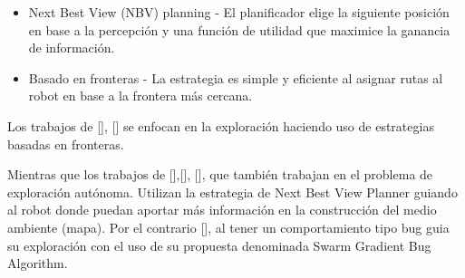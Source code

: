 \begin{itemize}\setlength{\itemsep}{-1mm}
\item Next Best View (NBV) planning - El planificador elige la siguiente posición en base a la percepción y una función de utilidad que maximice la ganancia de información. 
\item Basado en fronteras - La estrategia es simple y eficiente al asignar rutas al robot en base a la frontera más cercana.
\end{itemize}




Los trabajos de \citeauthor{CIESLEWSKI2017}[], \citeauthor{BARTOLOMEI2023}[] se enfocan en la exploración haciendo uso de estrategias basadas en fronteras.

Mientras que los trabajos de \citeauthor{PAPACHRISTOS2017}[],\citeauthor{SELIN2019}[], \citeauthor{RACER2022}[], que también trabajan en el problema de exploración autónoma. Utilizan la estrategia de Next Best View Planner guiando al robot donde puedan aportar más información en la construcción del medio ambiente (mapa). Por el contrario \citeauthor{BUG2019}[], al tener un comportamiento tipo bug guia su exploración con el uso de su propuesta denominada Swarm Gradient Bug Algorithm.

